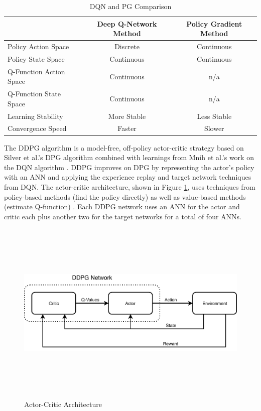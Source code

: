 \begin{table}[h]
	\caption{DQN and PG Comparison \cite{yu_dqn_vs_pg}}  \label{tab:dqn_pg_comparison}
	\begin{tabularx}{\textwidth}{@{} l|c|c @{}}
		\toprule
		& Deep Q-Network Method & Policy Gradient Method \\ 
		\midrule
		Policy Action Space & Discrete & Continuous \\
		Policy State Space & Continuous & Continuous \\
		Q-Function Action Space & Continuous & n/a \\
		Q-Function State Space & Continuous & n/a \\
		Learning Stability & More Stable & Less Stable \\
		Convergence Speed & Faster & Slower \\
		\bottomrule
	\end{tabularx} 
\end{table}

The DDPG algorithm is a model-free, off-policy actor-critic strategy based on Silver et al.'s DPG algorithm combined with learnings from Mnih et al.'s work on the DQN algorithm \cite{lillicrap_2016}\cite{Mnih_2015}\cite{silver_lever_heess_degris_wierstra_riedmiller}. DDPG improves on DPG by representing the actor's policy with an ANN and applying the experience replay and target network techniques from DQN. The actor-critic architecture, shown in Figure \ref{fig:actor_critic}, uses techniques from policy-based methods (find the policy directly) as well as value-based methods (estimate Q-function) \cite{actor_critic}. Each DDPG network uses an ANN for the actor and critic each plus another two for the target networks for a total of four ANNs. 
\begin{figure} [h] %
	\centering \includegraphics[width=6in, height=3.5in, keepaspectratio]{figures/actor_critic.pdf}
	\caption{Actor-Critic Architecture}\label{fig:actor_critic}
\end{figure}

